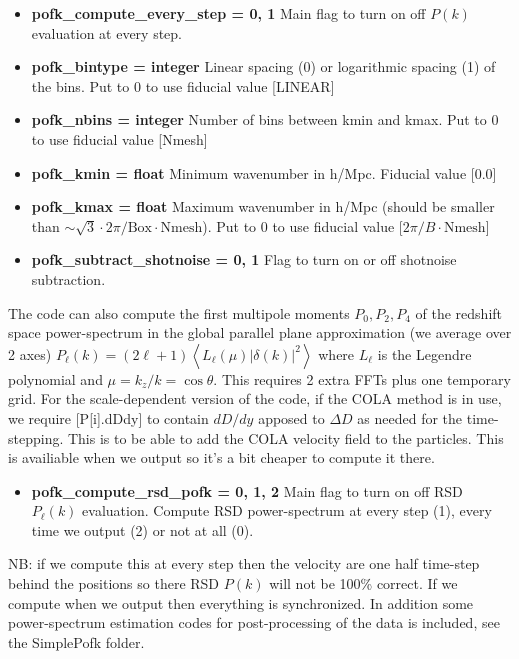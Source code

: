 \documentclass[usenatbib]{article}
\begin{document}
\begin{itemize}

\item \textbf{pofk\_compute\_every\_step = 0, 1} Main flag to turn on off $P(k)$ evaluation at every step.

\item \textbf{pofk\_bintype = integer} Linear spacing (0) or logarithmic spacing (1) of the bins. Put to 0 to use fiducial value [LINEAR]

\item \textbf{pofk\_nbins = integer} Number of bins between kmin and kmax. Put to 0 to use fiducial value [Nmesh]

\item \textbf{pofk\_kmin = float} Minimum wavenumber in h/Mpc. Fiducial value [0.0]

\item \textbf{pofk\_kmax = float} Maximum wavenumber in h/Mpc (should be smaller than $\sim \sqrt{3}\cdot 2\pi/\text{Box}\cdot\text{Nmesh}$). Put to 0 to use fiducial value [$2\pi/B\cdot \text{Nmesh}$]

\item \textbf{pofk\_subtract\_shotnoise = 0, 1} Flag to turn on or off shotnoise subtraction.

\end{itemize}

The code can also compute the first multipole moments $P_0,P_2,P_4$ of the redshift space power-spectrum in the global parallel plane approximation (we average over 2 axes) $P_\ell(k) = (2\ell+1)\left<L_\ell(\mu)|\delta(k)|^2\right>$ where $L_\ell$ is the Legendre polynomial and $\mu = k_z/k = \cos\theta$. This requires 2 extra FFTs plus one temporary grid. For the scale-dependent version of the code, if the COLA method is in use, we require [P[i].dDdy] to contain $dD/dy$ apposed to $\Delta D$ as needed for the time-stepping. This is to be able to add the COLA velocity field to the particles. This is availiable when we output so it's a bit cheaper to compute it there.

\begin{itemize}
\item \textbf{pofk\_compute\_rsd\_pofk = 0, 1, 2} Main flag to turn on off RSD $P_\ell(k)$ evaluation. Compute RSD power-spectrum at every step (1), every time we output (2) or not at all (0).
\end{itemize}

NB: if we compute this at every step then the velocity are one half time-step behind the positions so there RSD $P(k)$ will not be 100\% correct. If we compute when we output then everything is synchronized. In addition some power-spectrum estimation codes for post-processing of the data is included, see the SimplePofk folder.
\end{document}
